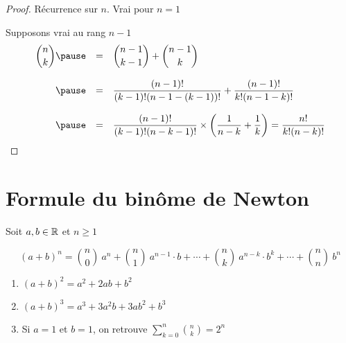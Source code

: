 
\begin{frame}

\begin{proposition}
\end{proposition}

\pause

\begin{proof}
Récurrence sur $n$. Vrai pour $n=1$
\pause

Supposons vrai au rang $n-1$ 
$$\begin{array}{rcl}
\displaystyle \binom n k \pause & = & \displaystyle \binom{n-1}{k-1} + \binom{n-1}{k} \\ \\
\pause
 & = & \displaystyle \frac{(n-1)!}{(k-1)!(n-1-(k-1))!} + \frac{(n-1)!}{k!(n-1-k)!} \\ \\
\pause
& = & \displaystyle \frac{(n-1)!}{(k-1)!(n-k-1)!} \times \left( \frac{1}{n-k} + \frac{1}{k} \right) = \frac{n!}{k!(n-k)!}
\end{array}$$
\end{proof}
\end{frame}

\section{Formule du binôme de Newton}

\begin{frame}
\begin{theoreme}
Soit $a,b \in\mathbb{R}$ et  $n \ge 1$
\end{theoreme}


\pause

{\small
$$(a+b)^n = \binom{n}{0}\ a^n + \binom{n}{1}\ a^{n-1}\cdot b
+ \cdots + \binom{n}{k} \ a^{n-k} \cdot b^{k}+\cdots + \binom{n}{n}\ b^n$$
}

\pause

\begin{exemple}
\begin{enumerate}
  \item $(a+b)^2= a^2 + 2ab + b^2$
\pause
  \item $(a+b)^3 = a^3 + 3a^2b + 3ab^2 + b^3$
\pause
  \item Si $a=1$ et $b=1$, on retrouve $\sum_{k=0}^n \binom{n}{k} = 2^n$
\end{enumerate}
\end{exemple}
\end{frame}


